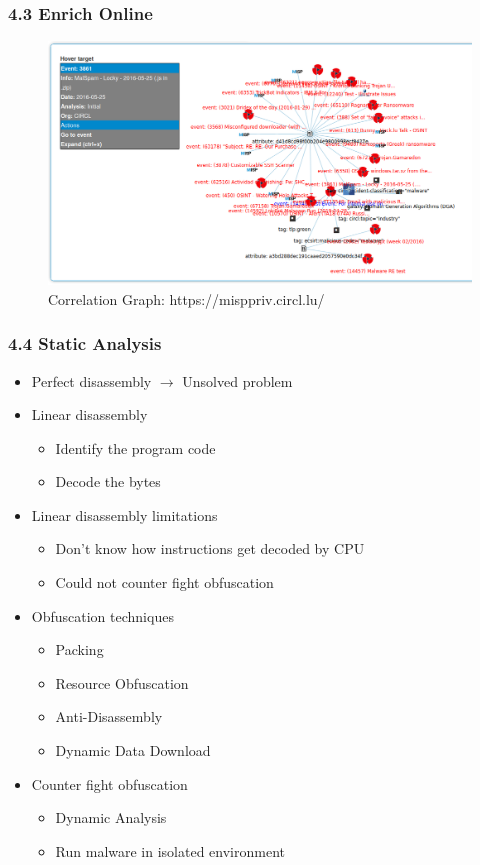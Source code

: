 \begin{frame}[fragile]
  \frametitle{4.3 Enrich Online}
    \begin{figure}
        \includegraphics[scale=0.27]{images/misp_2.png}
        \captionsetup{labelformat=empty,labelsep=none}
        \caption[]{\tiny Correlation Graph: https://misppriv.circl.lu/}
    \end{figure}
\end{frame}


\begin{frame}[fragile]
  \frametitle{4.4 Static Analysis}
    \begin{itemize}
        \item Perfect disassembly $\to$ Unsolved problem
        \item Linear disassembly
        \begin{itemize}
            \item Identify the program code
            \item Decode the bytes
        \end{itemize}
        \item Linear disassembly limitations
        \begin{itemize}
            \item Don't know how instructions get decoded by CPU
            \item Could not counter fight obfuscation
        \end{itemize}
        \item Obfuscation techniques
        \begin{itemize}
            \item Packing
            \item Resource Obfuscation
            \item Anti-Disassembly
            \item Dynamic Data Download
        \end{itemize}
        \item Counter fight obfuscation
        \begin{itemize}
            \item Dynamic Analysis
            \item Run malware in isolated environment
        \end{itemize}
    \end{itemize}
\end{frame}



